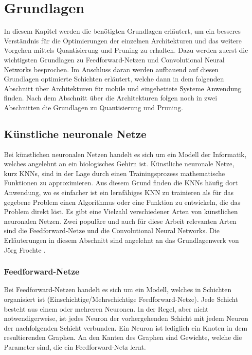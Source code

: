 \chapter{Grundlagen}
\label{grundlagen}
In diesem Kapitel werden die benötigten Grundlagen erläutert, um ein besseres Verständ\-nis für die Optimierungen der einzelnen Architekturen und das weitere Vorgehen mittels Quantisierung und Pruning zu erhalten.
Dazu werden zuerst die wichtigsten Grundlagen zu Feedforward-Netzen und Convolutional Neural Networks besprochen. Im Anschluss daran werden aufbauend auf diesen Grundlagen optimierte Schichten erläutert, welche dann in dem folgenden Abschnitt über Architekturen für mobile und eingebettete Systeme Anwendung finden. Nach dem Abschnitt über die Architekturen folgen noch in zwei Abschnitten die Grundlagen zu Quantisierung und Pruning. 



\section{Künstliche neuronale Netze}
Bei künstlichen neuronalen Netzen handelt es sich um ein Modell der Informatik, welches angelehnt an ein biologisches Gehirn ist. Künstliche neuronale Netze, kurz KNNs, sind in der Lage durch einen Trainingsprozess mathematische Funktionen zu approximieren. Aus diesem Grund finden die KNNs häufig dort Anwendung, wo es einfacher ist ein lernfähiges KNN zu trainieren als für das gegebene Problem einen Algorithmus oder eine Funktion zu entwickeln, die das Problem direkt löst. Es gibt eine Vielzahl verschiedener Arten von künstlichen neuronalen Netzen. Zwei populäre und auch für diese Arbeit relevanten Arten sind die Feedforward-Netze und die Convolutional Neural Networks.
Die Erläuterungen in diesem Abschnitt sind angelehnt an das Grundlagenwerk von Jörg Frochte \cite{frochte_maschinelles_2019}.


\subsection{Feedforward-Netze}
\label{FFNN}
Bei Feedforward-Netzen handelt es sich um ein Modell, welches in Schichten organisiert ist (Einschichtige/Mehrschichtige Feedforward-Netze). Jede Schicht besteht aus einem oder mehreren Neuronen. In der Regel, aber nicht notwendigerweise, ist jedes Neuron der vorhergehenden Schicht mit jedem Neuron der nachfolgenden Schicht verbunden. Ein Neuron ist lediglich ein Knoten in dem resultierenden Graphen. An den Kanten des Graphen sind Gewichte, welche die Parameter sind, die ein Feedforward-Netz lernt.

